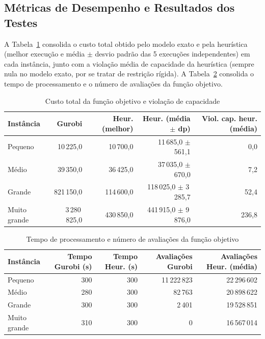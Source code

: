 \documentclass[12pt,a4paper]{article}
\begin{document}
\subsection{Métricas de Desempenho e Resultados dos Testes}

A Tabela~\ref{tab:custo} consolida o custo total obtido pelo modelo exato e pela
heurística (melhor execução e média $\pm$ desvio padrão das 5 execuções
independentes) em cada instância, junto com a violação média de capacidade da
heurística (sempre nula no modelo exato, por se tratar de restrição rígida). A
Tabela~\ref{tab:esforco} consolida o tempo de processamento e o número de avaliações
da função objetivo.

\begin{table}[h]
\centering
\caption{Custo total da função objetivo e violação de capacidade}
\label{tab:custo}
\footnotesize
\begin{tabular}{lrrrr}
\toprule
Instância & Gurobi & Heur. (melhor) & Heur. (média $\pm$ dp) & Viol. cap. heur. (média) \\
\midrule
Pequeno       & 10\,225,0    & 10\,700,0    & 11\,685,0 $\pm$ 561,1     & 0,0 \\
Médio         & 39\,350,0    & 36\,425,0    & 37\,035,0 $\pm$ 670,0     & 7,2 \\
Grande        & 821\,150,0   & 114\,600,0   & 118\,025,0 $\pm$ 3\,285,7 & 52,4 \\
Muito grande  & 3\,280\,825,0 & 430\,850,0  & 441\,915,0 $\pm$ 9\,876,0 & 236,8 \\
\bottomrule
\end{tabular}
\end{table}

\begin{table}[h]
\centering
\caption{Tempo de processamento e número de avaliações da função objetivo}
\label{tab:esforco}
\footnotesize
\begin{tabular}{lrrrr}
\toprule
Instância & Tempo Gurobi (s) & Tempo Heur. (s) & Avaliações Gurobi & Avaliações Heur. (média) \\
\midrule
Pequeno       & 300 & 300 & 11\,222\,823 & 22\,296\,602 \\
Médio         & 280 & 300 & 82\,763      & 20\,898\,622 \\
Grande        & 300 & 300 & 2\,401       & 19\,528\,851 \\
Muito grande  & 310 & 300 & 0            & 16\,567\,014 \\
\bottomrule
\end{tabular}
\end{table}
\end{document}
